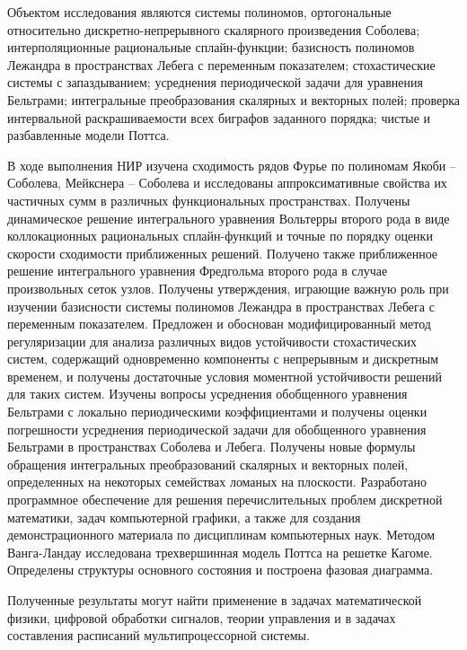 


Объектом исследования являются системы полиномов, ортогональные относительно дискретно-непрерывного скалярного произведения Соболева; интерполяционные рациональные сплайн-функции;
базисность полиномов Лежандра в пространствах Лебега с переменным показателем;
стохастические системы с запаздыванием;
усреднения периодической задачи для уравнения Бельтрами;
интегральные преобразования скалярных и векторных полей;
проверка интервальной раскрашиваемости всех биграфов заданного порядка;
чистые и разбавленные модели Поттса.

В ходе выполнения НИР изучена сходимость рядов Фурье по полиномам Якоби -- Соболева, Мейкснера -- Соболева и исследованы аппроксимативные свойства их частичных сумм в различных функциональных пространствах. Получены динамическое решение интегрального уравнения Вольтерры второго рода в виде коллокационных рациональных сплайн-функций и точные по порядку оценки скорости сходимости приближенных решений. Получено также приближенное решение интегрального уравнения Фредгольма второго рода в случае произвольных сеток узлов.
Получены утверждения, играющие важную роль при изучении базисности системы полиномов Лежандра в пространствах Лебега с переменным показателем.
Предложен и обоснован модифицированный метод регуляризации для анализа различных видов устойчивости стохастических систем, содержащий одновременно компоненты с непрерывным и дискретным временем, и получены достаточные условия моментной устойчивости решений для таких систем.
Изучены вопросы усреднения обобщенного уравнения Бельтрами с локально периодическими коэффициентами и получены оценки погрешности усреднения периодической задачи для обобщенного уравнения Бельтрами в пространствах Соболева и Лебега.
Получены новые формулы обращения интегральных преобразований скалярных и векторных полей, определенных на некоторых семействах ломаных на плоскости.
Разработано программное обеспечение для решения перечислительных проблем дискретной математики, задач компьютерной графики, а также для создания демонстрационного материала по дисциплинам компьютерных наук.
Методом Ванга-Ландау исследована трехвершинная модель Поттса на решетке Кагоме.
Определены структуры основного состояния и построена фазовая диаграмма.

Полученные результаты могут найти применение в задачах математической физики, цифровой обработки сигналов, теории управления и в задачах составления расписаний мультипроцессорной системы.